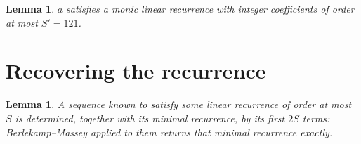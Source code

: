 \documentclass[11pt,a4paper]{article}
\theoremstyle{plain}
\newtheorem{lemma}[theorem]{Lemma}
\theoremstyle{definition}
\begin{document}
\begin{lemma}\label{lem:cf}
$a$ satisfies a monic linear recurrence with integer coefficients of order at most
$S'=121$.
\end{lemma}

\section{Recovering the recurrence}

\begin{lemma}\label{lem:bm}
A sequence known to satisfy some linear recurrence of order at most $S$ is determined, together
with its minimal recurrence, by its first $2S$ terms: Berlekamp--Massey applied to them returns
that minimal recurrence exactly.
\end{lemma}
\end{document}

